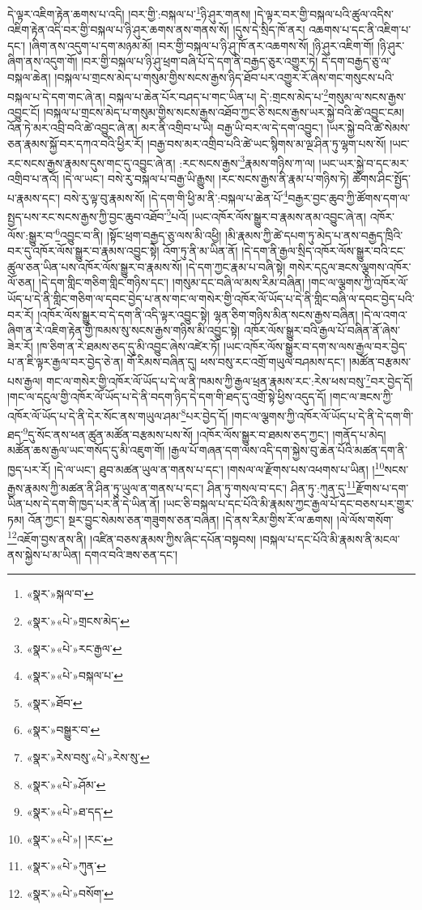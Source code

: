 དེ་ལྟར་འཇིག་རྟེན་ཆགས་པ་འདི། །བར་གྱི་:བསྐལ་པ་\footnote{«སྣར་»སྐལ་བ་}ཉི་ཤུར་གནས། །དེ་ལྟར་བར་གྱི་བསྐལ་པའི་ཚུལ་འདིས་འཇིག་རྟེན་འདི་བར་གྱི་བསྐལ་པ་ཉི་ཤུར་ཆགས་ནས་གནས་སོ། །དུས་དེ་སྲིད་ཁོ་ནར། འཆགས་པ་དང་ནི་འཇིག་པ་དང་། །ཞིག་ནས་འདུག་པ་དག་མཉམ་མོ། །བར་གྱི་བསྐལ་པ་ཉི་ཤུ་ཁོ་ནར་འཆགས་སོ། །ཉི་ཤུར་འཇིག་གོ། །ཉི་ཤུར་ཞིག་ནས་འདུག་གོ། །བར་གྱི་བསྐལ་པ་ཉི་ཤུ་ཕྲག་བཞི་པོ་དེ་དག་ནི་བརྒྱད་ཅུར་འགྱུར་ཏེ། དེ་དག་བརྒྱད་ཅུ་ལ་བསྐལ་ཆེན། །བསྐལ་པ་གྲངས་མེད་པ་གསུམ་གྱིས་སངས་རྒྱས་ཉིད་ཐོབ་པར་འགྱུར་རོ་ཞེས་གང་གསུངས་པའི་བསྐལ་པ་དེ་དག་གང་ཞེ་ན། བསྐལ་པ་ཆེན་པོར་བཤད་པ་གང་ཡིན་པ། དེ་:གྲངས་མེད་པ་\footnote{«སྣར་»«པེ་»གྲངས་མེད་}གསུམ་ལ་སངས་རྒྱས་འབྱུང་ངོ། །བསྐལ་པ་གྲངས་མེད་པ་གསུམ་གྱིས་སངས་རྒྱས་འཐོབ་ཀྱང་ཅི་སངས་རྒྱས་ཡར་སྐྱེ་བའི་ཚེ་འབྱུང་ངམ། འོན་ཏེ་མར་འབྲི་བའི་ཚེ་འབྱུང་ཞེ་ན། མར་ནི་འགྲིབ་པ་ཡི། བརྒྱ་ཡི་བར་ལ་དེ་དག་འབྱུང་། །ཡར་སྐྱེ་བའི་ཚེ་སེམས་ཅན་རྣམས་སྐྱོ་བར་དཀའ་བའི་ཕྱིར་རོ། །བརྒྱ་བས་མར་འགྲིབ་པའི་ཚེ་ཡང་སྙིགས་མ་ལྔ་ཤིན་ཏུ་ལྷག་པས་སོ། །ཡང་རང་སངས་རྒྱས་རྣམས་དུས་གང་དུ་འབྱུང་ཞེ་ན། :རང་སངས་རྒྱས་\footnote{«སྣར་»«པེ་»རང་རྒྱལ་}རྣམས་གཉིས་ཀ་ལ། །ཡང་ཡར་སྐྱེ་བ་དང་མར་འགྲིབ་པ་ནའོ། །དེ་ལ་ཡང་། བསེ་རུ་བསྐལ་པ་བརྒྱ་ཡི་རྒྱུས། །རང་སངས་རྒྱས་ནི་རྣམ་པ་གཉིས་ཏེ། ཚོགས་ཤིང་སྤྱོད་པ་རྣམས་དང་། བསེ་རུ་ལྟ་བུ་རྣམས་སོ། །དེ་དག་གི་ཕྱི་མ་ནི་:བསྐལ་པ་ཆེན་པོ་\footnote{«སྣར་»«པེ་»བསྐལ་པ་}བརྒྱར་བྱང་ཆུབ་ཀྱི་ཚོགས་དག་ལ་སྤྱད་པས་རང་སངས་རྒྱས་ཀྱི་བྱང་ཆུབ་འཐོབ་\footnote{«སྣར་»ཐོབ་}པའོ། །ཡང་འཁོར་ལོས་སྒྱུར་བ་རྣམས་ནམ་འབྱུང་ཞེ་ན། འཁོར་ལོས་:སྒྱུར་བ་\footnote{«སྣར་»བསྒྱུར་བ་}འབྱུང་བ་ནི། །སྟོང་ཕྲག་བརྒྱད་ཅུ་ལས་མི་འཕྱི། །མི་རྣམས་ཀྱི་ཚེ་དཔག་ཏུ་མེད་པ་ནས་བརྒྱད་ཁྲིའི་བར་དུ་འཁོར་ལོས་སྒྱུར་བ་རྣམས་འབྱུང་སྟེ། འོག་ཏུ་ནི་མ་ཡིན་ནོ། །དེ་དག་ནི་རྒྱལ་སྲིད་འཁོར་ལོས་སྒྱུར་བའི་ངང་ཚུལ་ཅན་ཡིན་པས་འཁོར་ལོས་སྒྱུར་བ་རྣམས་སོ། །དེ་དག་ཀྱང་རྣམ་པ་བཞི་སྟེ། གསེར་དངུལ་ཟངས་ལྕགས་འཁོར་ལོ་ཅན། །དེ་དག་གླིང་གཅིག་གླིང་གཉིས་དང་། །གསུམ་དང་བཞི་ལ་མས་རིམ་བཞིན། །གང་ལ་ལྕགས་ཀྱི་འཁོར་ལོ་ཡོད་པ་དེ་ནི་གླིང་གཅིག་ལ་དབང་བྱེད་པ་ནས་གང་ལ་གསེར་གྱི་འཁོར་ལོ་ཡོད་པ་དེ་ནི་གླིང་བཞི་ལ་དབང་བྱེད་པའི་བར་རོ། །འཁོར་ལོས་སྒྱུར་བ་དེ་དག་ནི་འདི་ལྟར་འབྱུང་སྟེ། ལྷན་ཅིག་གཉིས་མིན་སངས་རྒྱས་བཞིན། །དེ་ལ་འགའ་ཞིག་ན་རེ་འཇིག་རྟེན་གྱི་ཁམས་སུ་སངས་རྒྱས་གཉིས་མི་འབྱུང་སྟེ། འཁོར་ལོས་སྒྱུར་བའི་རྒྱལ་པོ་བཞིན་ནོ་ཞེས་ཟེར་རོ། །ཁ་ཅིག་ན་རེ་ཐམས་ཅད་དུ་མི་འབྱུང་ཞེས་འཛེར་ཏོ། །ཡང་འཁོར་ལོས་སྒྱུར་བ་དག་ས་ལས་རྒྱལ་བར་བྱེད་པ་ན་ཇི་ལྟར་རྒྱལ་བར་བྱེད་ཅེ་ན། གོ་རིམས་བཞིན་དུ། ཕས་བསུ་རང་འགྲོ་གཡུལ་བཤམས་དང་། །མཚོན་བརྩམས་པས་རྒྱལ། གང་ལ་གསེར་གྱི་འཁོར་ལོ་ཡོད་པ་དེ་ལ་ནི་ཁམས་ཀྱི་རྒྱལ་ཕྲན་རྣམས་རང་:རེས་ཕས་བསུ་\footnote{«སྣར་»རེས་བསུ་«པེ་»རེས་སུ་}བར་བྱེད་དོ། །གང་ལ་དངུལ་གྱི་འཁོར་ལོ་ཡོད་པ་དེ་ནི་བདག་ཉིད་དེ་དག་གི་ཐད་དུ་འགྲོ་སྟེ་ཕྱིས་འདུད་དོ། །གང་ལ་ཟངས་ཀྱི་འཁོར་ལོ་ཡོད་པ་དེ་ནི་དེར་སོང་ནས་གཡུལ་ཤམ་\footnote{«སྣར་»«པེ་»ཤོམ་}པར་བྱེད་དོ། །གང་ལ་ལྕགས་ཀྱི་འཁོར་ལོ་ཡོད་པ་དེ་ནི་དེ་དག་གི་ཐད་\footnote{«སྣར་»«པེ་»ཐ་དད་}དུ་སོང་ནས་ཕན་ཚུན་མཚོན་བརྩམས་པས་སོ། །འཁོར་ལོས་སྒྱུར་བ་ཐམས་ཅད་ཀྱང་། །གནོད་པ་མེད། མཚོན་ཆས་རྒྱལ་ཡང་གསོད་དུ་མི་འཇུག་གོ། །རྒྱལ་པོ་གཞན་དག་ལས་འདི་དག་སྐྱེས་བུ་ཆེན་པོའི་མཚན་དག་ནི་ཁྱད་པར་རོ། །དེ་ལ་ཡང་། ཐུབ་མཚན་ཡུལ་ན་གནས་པ་དང་། །གསལ་ལ་རྫོགས་པས་འཕགས་པ་ཡིན། །\footnote{«སྣར་»«པེ་»། །རང་}སངས་རྒྱས་རྣམས་ཀྱི་མཚན་ནི་ཤིན་ཏུ་ཡུལ་ན་གནས་པ་དང་། ཤིན་ཏུ་གསལ་བ་དང་། ཤིན་ཏུ་:ཀུན་དུ་\footnote{«སྣར་»«པེ་»ཀུན་}རྫོགས་པ་དག་ཡིན་པས་དེ་དག་གི་ཁྱད་པར་ནི་དེ་ཡིན་ནོ། །ཡང་ཅི་བསྐལ་པ་དང་པོའི་མི་རྣམས་ཀྱང་རྒྱལ་པོ་དང་བཅས་པར་གྱུར་ཏམ། འོན་ཀྱང་། སྔར་བྱུང་སེམས་ཅན་གཟུགས་ཅན་བཞིན། །དེ་ནས་རིམ་གྱིས་རོ་ལ་ཆགས། །ལེ་ལོས་གསོག་\footnote{«སྣར་»«པེ་»བསོག་}འཇོག་བྱས་ནས་ནི། །འཛིན་བཅས་རྣམས་ཀྱིས་ཞིང་དཔོན་བསྟབས། །བསྐལ་པ་དང་པོའི་མི་རྣམས་ནི་མངལ་ནས་སྐྱེས་པ་མ་ཡིན། དགའ་བའི་ཟས་ཅན་དང་། 